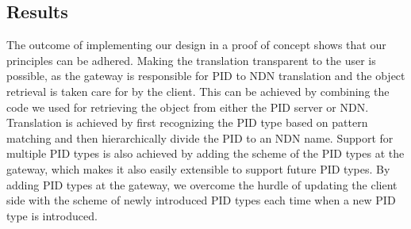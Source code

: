 \subsection{Results}
The outcome of implementing our design in a proof of concept shows that our principles can be adhered.
Making the translation transparent to the user is possible, as the gateway is responsible for PID to NDN translation and the object retrieval is taken care for by the client. This can be achieved by combining the code we used for retrieving the object from either the PID server or NDN. Translation is achieved by first recognizing the PID type based on pattern matching and then hierarchically divide the PID to an NDN name. Support for multiple PID types is also achieved by adding the scheme of the PID types at the gateway, which makes it also easily extensible to support future PID types. By adding PID types at the gateway, we overcome the hurdle of updating the client side with the scheme of newly introduced PID types each time when a new PID type is introduced.
